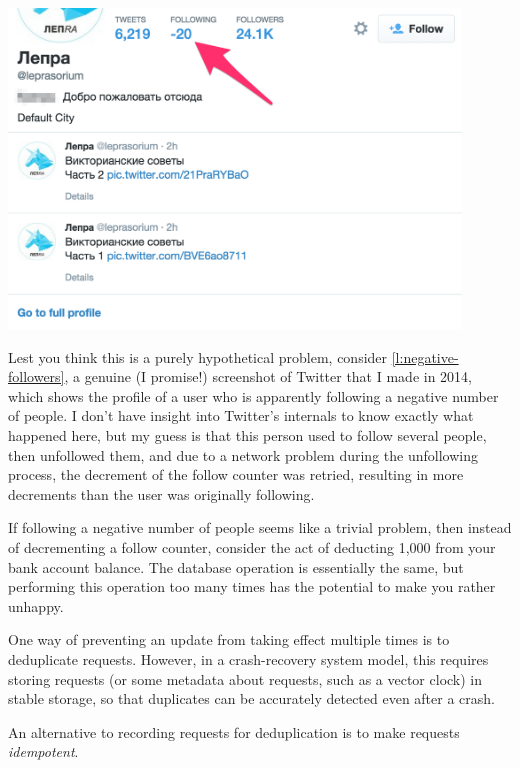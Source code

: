 \begin{frame}
    \label{s:negative-followers}
    \includegraphics[width=12cm]{images/negative-followers.png}
\end{frame}
\label{l:negative-followers}

Lest you think this is a purely hypothetical problem, consider \autoref{l:negative-followers}, a genuine (I promise!) screenshot of Twitter that I made in 2014, which shows the profile of a user who is apparently following a negative number of people.
I don't have insight into Twitter's internals to know exactly what happened here, but my guess is that this person used to follow several people, then unfollowed them, and due to a network problem during the unfollowing process, the decrement of the follow counter was retried, resulting in more decrements than the user was originally following.

If following a negative number of people seems like a trivial problem, then instead of decrementing a follow counter, consider the act of deducting {\textsterling}1,000 from your bank account balance.
The database operation is essentially the same, but performing this operation too many times has the potential to make you rather unhappy.

One way of preventing an update from taking effect multiple times is to deduplicate requests.
However, in a crash-recovery system model, this requires storing requests (or some metadata about requests, such as a vector clock) in stable storage, so that duplicates can be accurately detected even after a crash.

An alternative to recording requests for deduplication is to make requests \emph{idempotent}.

